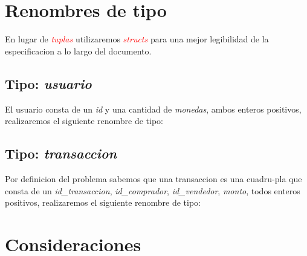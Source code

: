 \documentclass[10pt,a4paper]{article}
\begin{document}
\maketitle

\section{Renombres de tipo}
En lugar de \textcolor{red}{\textit{tuplas}} utilizaremos \textcolor{red}{\textit{structs}} para una mejor legibilidad de la especificacion a lo largo del documento.
\subsection{Tipo: \textit{usuario}}
El usuario consta de un \textit{id} y una cantidad de \textit{monedas}, ambos enteros positivos, realizaremos el siguiente renombre de tipo:

\vspace{0.3cm}
\noindent
{}
\vspace{0.1cm}

\subsection{Tipo: \textit{transaccion}}
Por definicion del problema sabemos que una transaccion es una cuadru-pla que consta de un \textit{id\_transaccion}, \textit{id\_comprador}, \textit{id\_vendedor}, \textit{monto}, todos enteros positivos, realizaremos el siguiente renombre de tipo:

\vspace{0.3cm}
\noindent
{}
\vspace{0.1cm}

\section{Consideraciones}
\end{document}
